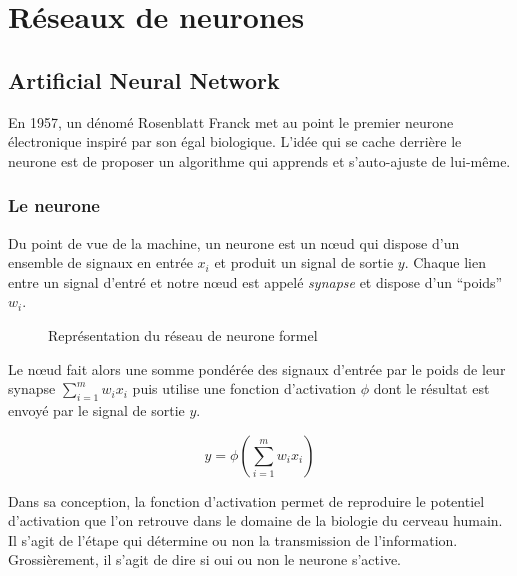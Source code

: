 \chapter{Réseaux de neurones}

\section{Artificial Neural Network}

En 1957, un dénomé Rosenblatt Franck met au point le premier neurone électronique inspiré par son égal biologique.
L'idée qui se cache derrière le neurone est de proposer un algorithme qui apprends et s'auto-ajuste de lui-même.

\subsection{Le neurone}

Du point de vue de la machine, un neurone est un n\oe ud qui dispose d'un ensemble de signaux en entrée $x_i$ et produit un signal de sortie $y$.
Chaque lien entre un signal d'entré et notre n\oe ud est appelé \textit{synapse} et dispose d'un ``poids'' $w_i$.

\begin{figure}[ht]	
	\centering
	\caption{Représentation du réseau de neurone formel}
\end{figure}

Le n\oe ud fait alors une somme pondérée des signaux d'entrée par le poids de leur synapse $\sum_{i=1}^m w_i x_i$ puis utilise une fonction d'activation $\phi$ dont le résultat est envoyé par le signal de sortie $y$.

\begin{equation}
	y = \phi\left(\sum_{i=1}^m w_i x_i \right)
\end{equation}

Dans sa conception, la fonction d'activation permet de reproduire le potentiel d'activation que l'on retrouve dans le domaine de la biologie du cerveau humain. Il s'agit de l'étape qui détermine ou non la transmission de l'information. Grossièrement, il s'agit de dire si oui ou non le neurone s'active.

